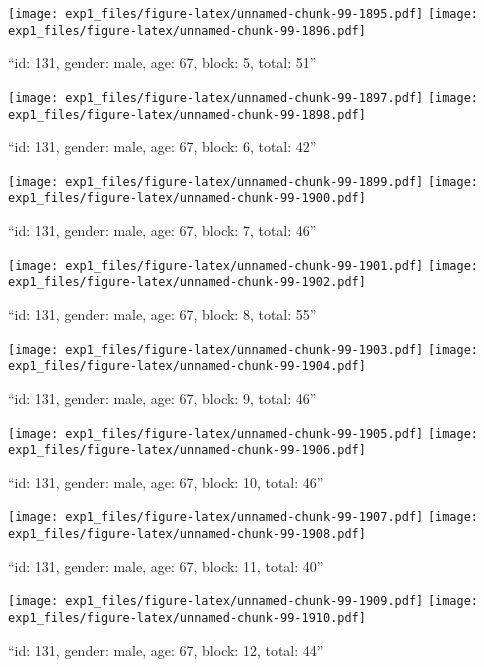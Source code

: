 \documentclass[,]{article}
\begin{document}
\texttt{[image: exp1\_files/figure-latex/unnamed-chunk-99-1895.pdf]}
\texttt{[image: exp1\_files/figure-latex/unnamed-chunk-99-1896.pdf]}

\newpage
[1] 

``id: 131, gender: male, age: 67, block: 5, total: 51''

\texttt{[image: exp1\_files/figure-latex/unnamed-chunk-99-1897.pdf]}
\texttt{[image: exp1\_files/figure-latex/unnamed-chunk-99-1898.pdf]}

\newpage
[1] 

``id: 131, gender: male, age: 67, block: 6, total: 42''

\texttt{[image: exp1\_files/figure-latex/unnamed-chunk-99-1899.pdf]}
\texttt{[image: exp1\_files/figure-latex/unnamed-chunk-99-1900.pdf]}

\newpage
[1] 

``id: 131, gender: male, age: 67, block: 7, total: 46''

\texttt{[image: exp1\_files/figure-latex/unnamed-chunk-99-1901.pdf]}
\texttt{[image: exp1\_files/figure-latex/unnamed-chunk-99-1902.pdf]}

\newpage
[1] 

``id: 131, gender: male, age: 67, block: 8, total: 55''

\texttt{[image: exp1\_files/figure-latex/unnamed-chunk-99-1903.pdf]}
\texttt{[image: exp1\_files/figure-latex/unnamed-chunk-99-1904.pdf]}

\newpage
[1] 

``id: 131, gender: male, age: 67, block: 9, total: 46''

\texttt{[image: exp1\_files/figure-latex/unnamed-chunk-99-1905.pdf]}
\texttt{[image: exp1\_files/figure-latex/unnamed-chunk-99-1906.pdf]}

\newpage
[1] 

``id: 131, gender: male, age: 67, block: 10, total: 46''

\texttt{[image: exp1\_files/figure-latex/unnamed-chunk-99-1907.pdf]}
\texttt{[image: exp1\_files/figure-latex/unnamed-chunk-99-1908.pdf]}

\newpage
[1] 

``id: 131, gender: male, age: 67, block: 11, total: 40''

\texttt{[image: exp1\_files/figure-latex/unnamed-chunk-99-1909.pdf]}
\texttt{[image: exp1\_files/figure-latex/unnamed-chunk-99-1910.pdf]}

\newpage
[1] 

``id: 131, gender: male, age: 67, block: 12, total: 44''
\end{document}
